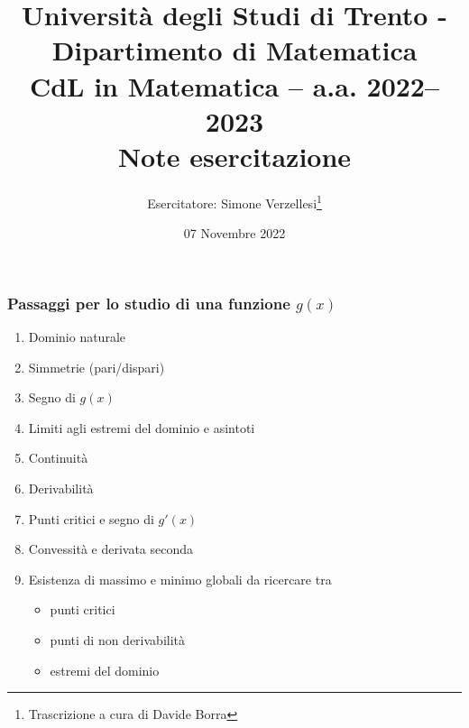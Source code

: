 \documentclass{article}
\title{Università degli Studi di Trento - Dipartimento di Matematica\\
CdL in Matematica – a.a. 2022–2023\\ Note esercitazione}
\author{Esercitatore: Simone Verzellesi\thanks{Trascrizione a cura di Davide Borra}}
\date{07 Novembre 2022}
\begin{document}
\maketitle
{}
\setlength{\headheight}{30pt}
\subsubsection*{Passaggi per lo studio di una funzione $g(x)$}
\begin{enumerate}
    \item Dominio naturale
    \item Simmetrie (pari/dispari)
    \item Segno di $g(x)$
    \item Limiti agli estremi del dominio e asintoti
    \item Continuità
    \item Derivabilità
    \item Punti critici e segno di $g'(x)$
    \item Convessità e derivata seconda
    \item Esistenza di massimo e minimo globali da ricercare tra 
    \begin{itemize}
        \item punti critici
        \item punti di non derivabilità
        \item estremi del dominio
    \end{itemize}
\end{enumerate}
\end{document}
